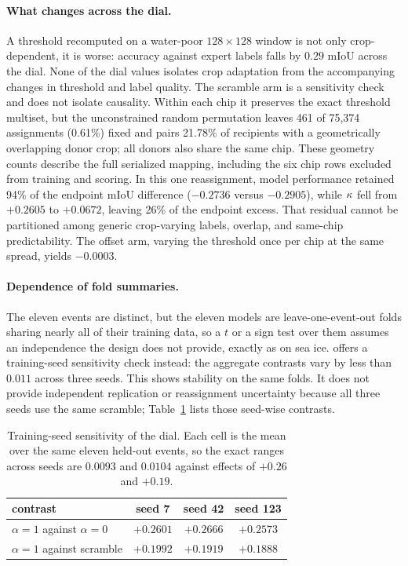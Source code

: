 \paragraph{What changes across the dial.} A threshold recomputed on a water-poor
$128 \times 128$ window is not only crop-dependent, it is worse: accuracy against
expert labels falls by $0.29$ mIoU across the dial. None of the dial values isolates
crop adaptation from the accompanying changes in threshold and label quality. The
scramble arm is a sensitivity check and does not isolate causality. Within
each chip it preserves the exact threshold multiset, but the unconstrained random
permutation leaves 461 of 75{,}374 assignments (0.61\%) fixed and pairs 21.78\% of
recipients with a geometrically overlapping donor crop; all donors also share the
same chip. These geometry counts describe the full serialized mapping, including
the six chip rows excluded from training and scoring. In this one reassignment, model performance retained 94\% of the endpoint
mIoU difference ($-0.2736$ versus $-0.2905$), while $\kappa$ fell from $+0.2605$ to
$+0.0672$, leaving 26\% of the endpoint excess. That residual cannot be partitioned
among generic crop-varying labels, overlap, and same-chip predictability. The offset
arm, varying the threshold once per chip at the same spread, yields $-0.0003$.

\paragraph{Dependence of fold summaries.} The eleven events are distinct, but
the eleven models are leave-one-event-out folds sharing nearly all of their
training data, so a $t$ or a sign test over them assumes an independence the
design does not provide, exactly as on sea ice.  offers
a training-seed sensitivity check instead: the aggregate contrasts vary by less
than $0.011$ across three seeds. This shows stability on the same folds. It does not
provide independent replication or reassignment uncertainty because all three seeds
use the same scramble; Table~\ref{tab:seeds} lists those seed-wise contrasts.

\begin{table}[tb]
\centering
\footnotesize
\setlength{\tabcolsep}{4pt}
\begin{tabular}{lccc}
\toprule
contrast & seed 7 & seed 42 & seed 123 \\
\midrule
$\alpha{=}1$ against $\alpha{=}0$ & $+0.2601$ & $+0.2666$ & $+0.2573$ \\
$\alpha{=}1$ against scramble & $+0.1992$ & $+0.1919$ & $+0.1888$ \\
\bottomrule
\end{tabular}
\caption{Training-seed sensitivity of the dial. Each cell is the mean over the same
eleven held-out events, so the exact ranges across seeds are $0.0093$ and $0.0104$ against
effects of $+0.26$ and $+0.19$.}
\label{tab:seeds}
\end{table}

